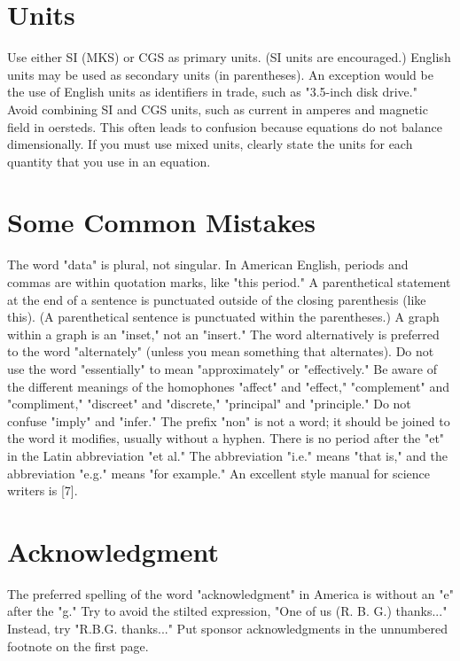 \documentclass[conference,letterpaper]{IEEEtran}
\begin{document}
\section{Units}
Use either SI (MKS) or CGS as primary units. (SI units are
encouraged.) English units may be used as secondary units (in
parentheses). An exception would be the use of English units as
identifiers in trade, such as "3.5-inch disk drive."\\
\indent
Avoid combining SI and CGS units, such as current in amperes and
magnetic field in oersteds. This often leads to confusion because
equations do not balance dimensionally. If you must use mixed
units, clearly state the units for each quantity that you use in
an equation.

\section{Some Common Mistakes}
The word "data" is plural, not singular. In American English,
periods and commas are within quotation marks, like "this period."
A parenthetical statement at the end of a sentence is punctuated
outside of the closing parenthesis (like this). (A parenthetical
sentence is punctuated within the parentheses.) A graph within a
graph is an "inset," not an "insert." The word alternatively is
preferred to the word "alternately" (unless you mean something
that alternates). Do not use the word "essentially" to mean
"approximately" or "effectively." Be aware of the different
meanings of the homophones "affect" and "effect," "complement" and
"compliment," "discreet" and "discrete," "principal" and
"principle." Do not confuse "imply" and "infer." The prefix "non"
is not a word; it should be joined to the word it modifies,
usually without a hyphen. There is no period after the "et" in the
Latin abbreviation "et al." The abbreviation "i.e." means "that
is," and the abbreviation "e.g." means "for example."  An
excellent style manual for science writers is [7].


\section*{Acknowledgment}
The preferred spelling of the word "acknowledgment" in America is
without an "e" after the "g." Try to avoid the stilted expression,
"One of us (R. B. G.) thanks..." Instead, try "R.B.G. thanks..." Put
sponsor acknowledgments in the unnumbered footnote on the first
page.
\end{document}
